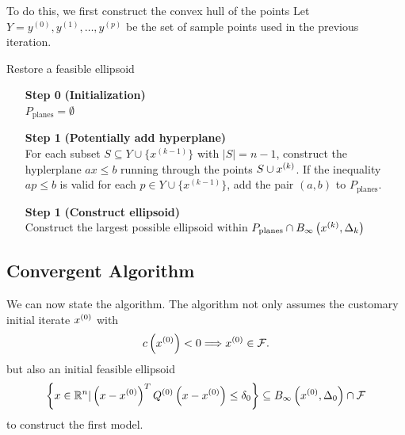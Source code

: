 To do this, we first construct the convex hull of the points 
Let $Y = y^{(0)}, y^{(1)}, \ldots, y^{(p)}$ be the set of sample points used in the previous iteration.

\begin{algorithm}[H]
    \caption{Restore a feasible ellipsoid}
    \label{restore_feasible_ellipsoid}
    \begin{itemize}
        \item[\textbf{Step 0}] \textbf{(Initialization)} \\
            $P_{\textrm{planes}} = \emptyset$
            
        \item[\textbf{Step 1}] \textbf{(Potentially add hyperplane)} \\
	    For each subset $S \subseteq Y \cup \{x^{(k-1)}\}$ with $|S| = n - 1$, construct the hyplerplane $ax\le b$ running through the points $S \cup x^{(k)}$.
	    If the inequality $ap \le b$ is valid for each $p \in Y \cup \{x^{(k-1)}\}$, add the pair $(a, b)$ to $P_{\textrm{planes}}$.
	
	\item[\textbf{Step 1}] \textbf{(Construct ellipsoid)} \\
	   Construct the largest possible ellipsoid within $P_{\textrm{planes}} \cap { B_{\infty}\left(x^{(k)}, \Delta_k\right) }$
    \end{itemize}
\end{algorithm}


\subsection{Convergent Algorithm}
\label{the_algroithm_section}

We can now state the algorithm.
The algorithm not only assumes the customary initial iterate $ {x^{(0)}} $ with 
\begin{align}
\label{initial_point_is_feasible}
c\left({x^{(0)}}\right) < 0 \Longrightarrow {x^{(0)}} \in {\mathcal F}.
\end{align}
but also an initial feasible ellipsoid
\begin{align}
\left\{x \in\mathbb R^n | \left(x - {x^{(0)}}\right)^T Q^{(0)} \left(x - {x^{(0)}}\right) \le \delta_0 \right\} \subseteq B_{\infty}\left({x^{(0)}}, \Delta_{0}\right) \cap {\mathcal F} \label{initial_ellipsoid}
\end{align}
to construct the first model.


